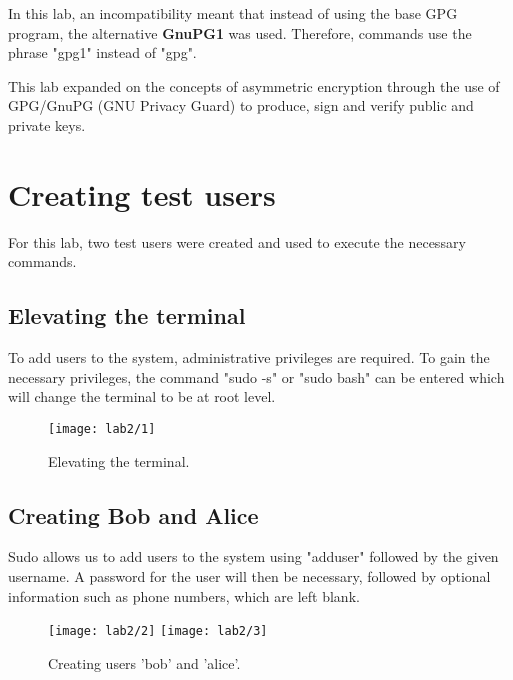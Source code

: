 \begin{tcolorbox}[colback=red!5!white,colframe=red!75!black,title=Important note]
    In this lab, an incompatibility meant that instead
    of using the base GPG program, the alternative \textbf{GnuPG1} was used.
    Therefore, commands use the phrase "gpg1" instead of "gpg".
\end{tcolorbox}

This lab expanded on the concepts of asymmetric encryption through the use of\newline
GPG/GnuPG (GNU Privacy Guard) to produce, sign and verify public and private keys.\\

\section{Creating test users}\label{sec:testUsers}
For this lab, two test users were created and used to execute the necessary commands.

\subsection{Elevating the terminal}\label{subsec:sudo}
To add users to the system, administrative privileges are required.
To gain the necessary privileges, the command "sudo -s" or "sudo bash" can be entered
which will change the terminal to be at root level.

\begin{figure}[H]
    \centering
    \texttt{[image: lab2/1]}
    \caption{Elevating the terminal.}
    \label{fig:sudo}
\end{figure}

\subsection{Creating Bob and Alice}\label{subsec:createUsers}
Sudo allows us to add users to the system using "adduser" followed by the given username.
A password for the user will then be necessary, followed by optional information such as phone
numbers, which are left blank.

\begin{figure}[H]
    \centering
    \texttt{[image: lab2/2]}
    \texttt{[image: lab2/3]}
    \caption{Creating users 'bob' and 'alice'.}
    \label{fig:createBob}
\end{figure}

